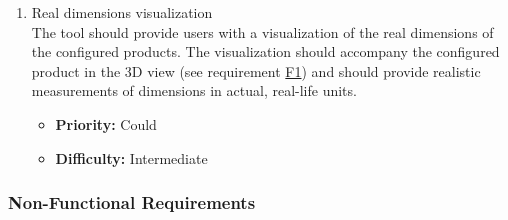 \begin{enumerate}[label=\textbf{F\arabic*:}, leftmargin=30pt]
\item \label{itm:F21} Real dimensions visualization
\vspace{2pt}
\\The tool should provide users with a visualization of the real dimensions of the configured products. The visualization should accompany the configured product in the 3D view (see requirement \hyperref[itm:F1]{F1}) and should provide realistic measurements of dimensions in actual, real-life units.
\begin{itemize}[noitemsep, label=\trianglebullet]
    \item \textbf{Priority:} Could
    \item \textbf{Difficulty:} Intermediate
\end{itemize}

\end{enumerate}


\subsubsection{Non-Functional Requirements}

